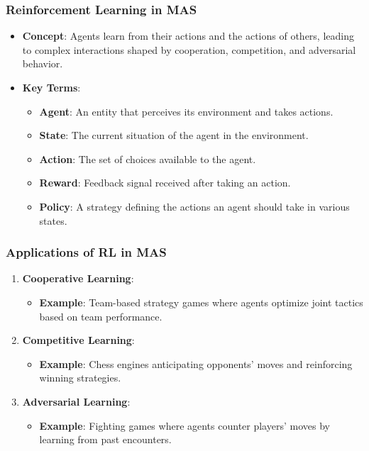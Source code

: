\documentclass[aspectratio=169]{beamer}
\begin{document}
\begin{frame}[fragile]
    \frametitle{Reinforcement Learning in MAS}
    \begin{itemize}
        \item \textbf{Concept}: Agents learn from their actions and the actions of others, leading to complex interactions shaped by cooperation, competition, and adversarial behavior.
        \item \textbf{Key Terms}:
            \begin{itemize}
                \item \textbf{Agent}: An entity that perceives its environment and takes actions.
                \item \textbf{State}: The current situation of the agent in the environment.
                \item \textbf{Action}: The set of choices available to the agent.
                \item \textbf{Reward}: Feedback signal received after taking an action.
                \item \textbf{Policy}: A strategy defining the actions an agent should take in various states.
            \end{itemize}
    \end{itemize}
\end{frame}

\begin{frame}[fragile]
    \frametitle{Applications of RL in MAS}
    \begin{enumerate}
        \item \textbf{Cooperative Learning}:
            \begin{itemize}
                \item \textbf{Example}: Team-based strategy games where agents optimize joint tactics based on team performance.
            \end{itemize}

        \item \textbf{Competitive Learning}:
            \begin{itemize}
                \item \textbf{Example}: Chess engines anticipating opponents' moves and reinforcing winning strategies.
            \end{itemize}

        \item \textbf{Adversarial Learning}:
            \begin{itemize}
                \item \textbf{Example}: Fighting games where agents counter players' moves by learning from past encounters.
            \end{itemize}
    \end{enumerate}
\end{frame}
\end{document}
